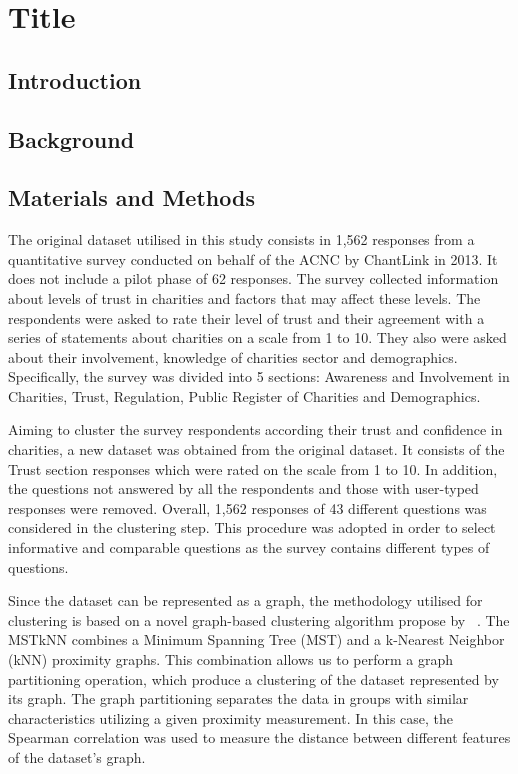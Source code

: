 \documentclass{article}
\begin{document}



\section{Title}

\subsection{Introduction}

\subsection{Background}

\subsection{Materials and Methods}


The original dataset utilised in this study consists in 1,562 responses from a
quantitative survey conducted on behalf of the ACNC by ChantLink in 2013. It
does not include a pilot phase of 62 responses. The survey collected information
about levels of trust in charities and factors that may affect these levels. The
respondents were asked to rate their level of trust and their agreement with a
series of statements about charities on a scale from 1 to 10. They also were
asked about their involvement, knowledge of charities sector and demographics.
Specifically, the survey was divided into 5 sections: Awareness and Involvement
in Charities, Trust, Regulation, Public Register of Charities and Demographics.

Aiming to cluster the survey respondents according their trust and confidence in
charities, a new dataset was obtained from the original dataset. It consists of
the Trust section responses which were rated on the scale from 1 to 10. In
addition, the questions not answered by all the respondents and those with
user-typed responses were removed. Overall, 1,562 responses of 43 different
questions was considered in the clustering step. This procedure was adopted in
order to select informative and comparable questions as the survey contains
different types of questions.

Since the dataset can be represented as a graph, the methodology utilised for
clustering is based on a novel graph-based clustering algorithm propose by
~\cite{Inostroza2008}. The MSTkNN combines a Minimum Spanning Tree (MST) and a
k-Nearest Neighbor (kNN) proximity graphs. This combination allows us to perform
a graph partitioning operation, which produce a clustering of the dataset
represented by its graph. The graph partitioning separates the data in groups
with similar characteristics utilizing a given proximity measurement. In this
case, the Spearman correlation was used to measure the distance between
different features of the dataset's graph.
\end{document}
